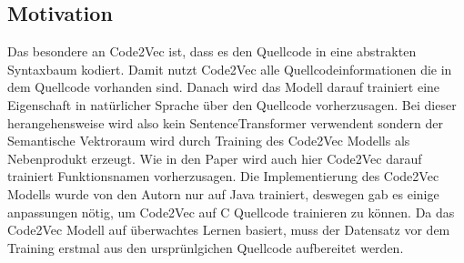 \documentclass[12pt,letterpaper,ngerman]{article}
\begin{document}
\subsection{Motivation} 
Das besondere an Code2Vec ist, dass es den Quellcode in eine abstrakten
Syntaxbaum kodiert. Damit nutzt Code2Vec alle Quellcodeinformationen die
in dem Quellcode vorhanden sind. Danach wird das Modell darauf trainiert
eine Eigenschaft in natürlicher Sprache über den Quellcode vorherzusagen.
Bei dieser herangehensweise wird also kein SentenceTransformer verwendent
sondern der Semantische Vektroraum wird durch Training des Code2Vec Modells
als Nebenprodukt erzeugt. Wie in den Paper wird auch hier Code2Vec
darauf trainiert Funktionsnamen vorherzusagen. Die Implementierung des Code2Vec
Modells wurde von den Autorn nur auf Java trainiert, deswegen gab es
einige anpassungen nötig, um Code2Vec auf C Quellcode trainieren zu können.
Da das Code2Vec Modell auf überwachtes Lernen basiert, muss der Datensatz 
vor dem Training erstmal aus den ursprünlgichen Quellcode aufbereitet werden.
\end{document}
